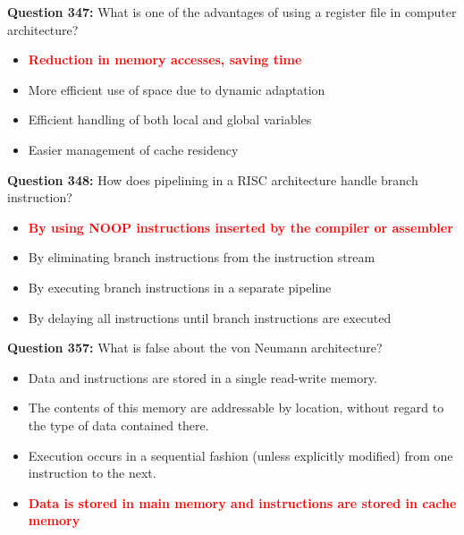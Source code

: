 \documentclass[12pt,a4paper]{article}
\begin{document}
\vspace{0.5cm}

\textbf{Question 347:} What is one of the advantages of using a register file in computer architecture?

\begin{itemize}
    \item[\textbf{A.}] \textcolor{red}{\textbf{Reduction in memory accesses, saving time}}
    \item[\textbf{B.}] More efficient use of space due to dynamic adaptation
    \item[\textbf{C.}] Efficient handling of both local and global variables
    \item[\textbf{D.}] Easier management of cache residency
\end{itemize}

\vspace{0.5cm}

\textbf{Question 348:} How does pipelining in a RISC architecture handle branch instruction?

\begin{itemize}
    \item[\textbf{A.}] \textcolor{red}{\textbf{By using NOOP instructions inserted by the compiler or assembler}}
    \item[\textbf{B.}] By eliminating branch instructions from the instruction stream
    \item[\textbf{C.}] By executing branch instructions in a separate pipeline
    \item[\textbf{D.}] By delaying all instructions until branch instructions are executed
\end{itemize}

\vspace{0.5cm}

\textbf{Question 357:} What is false about the von Neumann architecture?

\begin{itemize}
    \item[\textbf{A.}] Data and instructions are stored in a single read-write memory.
    \item[\textbf{B.}] The contents of this memory are addressable by location, without regard to the type of data contained there.
    \item[\textbf{C.}] Execution occurs in a sequential fashion (unless explicitly modified) from one instruction to the next.
    \item[\textbf{D.}] \textcolor{red}{\textbf{Data is stored in main memory and instructions are stored in cache memory}}
\end{itemize}
\end{document}
